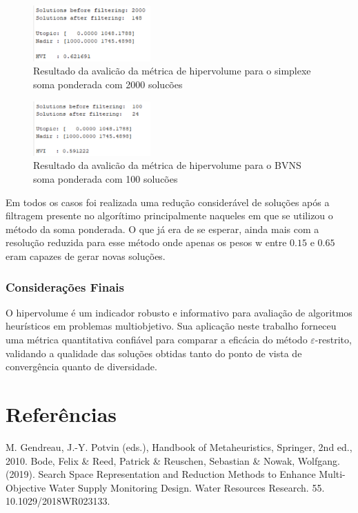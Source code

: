 \documentclass[
	12pt,				%
	oneside,			%
	a4paper,			%
	chapter=TITLE,
	sumario=tradicional,
	english,			%
	brazil				%
]{abntex2}
\begin{document}
\begin{figure}[h!]
	\caption{\label{fig:simplex2000HVI}Resultado da avalicão da métrica de hipervolume para o simplexe soma ponderada com 2000 solucões}
	\begin{center}
    \includegraphics[width=0.4\textwidth,trim=1 1 1 1,clip]{simplex2000HVI.png}
	\end{center}
\end{figure}

\begin{figure}[h!]
	\caption{\label{fig:somaPonderadaHVI}Resultado da avalicão da métrica de hipervolume para o BVNS soma ponderada com 100 solucões}
	\begin{center}
    \includegraphics[width=0.4\textwidth,trim=1 1 1 1,clip]{somaPonderadaHVI.png}
	\end{center}
\end{figure}

Em todos os casos foi realizada uma redução considerável de soluções após a filtragem presente no algorítimo principalmente naqueles em que se utilizou o método da soma ponderada.
O que já era de se esperar, ainda mais com a resolução reduzida para esse método onde apenas os pesos $\mathrm{w}$ entre $0.15$ e $0.65$ eram capazes de gerar novas soluções.

\subsection{Considerações Finais}

O hipervolume é um indicador robusto e informativo para avaliação de algoritmos heurísticos em problemas multiobjetivo. Sua aplicação neste trabalho
forneceu uma métrica quantitativa confiável para comparar a eficácia do método $\varepsilon$-restrito, validando a qualidade das soluções obtidas tanto do ponto de
vista de convergência quanto de diversidade.


\chapter{Referências}\label{cap:referencias} 

\noindent M. Gendreau, J.-Y. Potvin (eds.), Handbook of Metaheuristics, Springer, 2nd ed., 2010.
\noindent Bode, Felix \& Reed, Patrick \& Reuschen, Sebastian \& Nowak, Wolfgang. (2019). Search Space Representation and Reduction Methods to Enhance Multi-Objective Water Supply Monitoring Design. Water Resources Research. 55. 10.1029/2018WR023133. 
\end{document}
